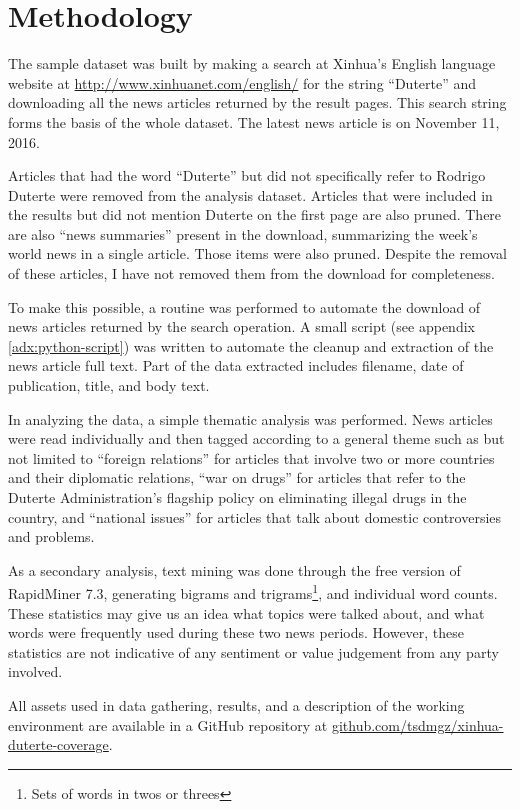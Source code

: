 \section{Methodology}\label{sec:methodology}

The sample dataset was built by making a search at Xinhua's English
language website at \url{http://www.xinhuanet.com/english/} for the
string ``Duterte'' and downloading all the news articles returned by the
result pages. This search string forms the basis of the whole dataset.
The latest news article is on November 11, 2016.

Articles that had the word ``Duterte'' but did not specifically refer to
Rodrigo Duterte were removed from the analysis dataset. Articles that
were included in the results but did not mention Duterte on the first
page are also pruned. There are also ``news summaries'' present in the
download, summarizing the week's world news in a single article. Those
items were also pruned. Despite the removal of these articles, I have
not removed them from the download for completeness.

To make this possible, a routine was performed to automate the
download of news articles returned by the search operation. A small
script (see appendix \ref{adx:python-script}) was written to automate
the cleanup and extraction of the news article full text. Part of the
data extracted includes filename, date of publication, title, and
body text.

In analyzing the data, a simple thematic analysis was performed. News
articles were read individually and then tagged according to a general
theme such as but not limited to ``foreign relations'' for articles that
involve two or more countries and their diplomatic relations, ``war on
drugs'' for articles that refer to the Duterte Administration's
flagship policy on eliminating illegal drugs in the country, and
``national issues'' for articles that talk about domestic controversies
and problems.

As a secondary analysis, text mining was done through the free version
of RapidMiner 7.3, generating bigrams and trigrams\footnote{Sets of
words in twos or threes}, and individual word counts. These statistics
may give us an idea what topics were talked about, and what words were
frequently used during these two news periods. However, these
statistics are not indicative of any sentiment or value judgement from
any party involved.

All assets used in data gathering, results, and a description of the
working environment are available in a GitHub repository at
\href{https://github.com/tsdmgz/xinhua-duterte-coverage}{github.com/tsdmgz/xinhua-duterte-coverage}.

